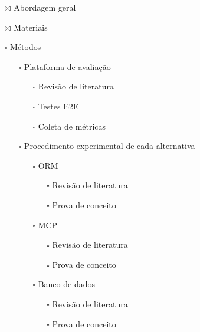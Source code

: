 \documentclass[
]{article}
\providecommand{\tightlist}{%
  \setlength{\itemsep}{0pt}\setlength{\parskip}{0pt}}
\begin{document}
\begin{itemize}
\tightlist
\item[$\boxtimes$]
  Abordagem geral
\item[$\boxtimes$]
  Materiais
\item[$\square$]
  Métodos

  \begin{itemize}
  \tightlist
  \item[$\square$]
    Plataforma de avaliação

    \begin{itemize}
    \tightlist
    \item[$\square$]
      Revisão de literatura
    \item[$\square$]
      Testes E2E
    \item[$\square$]
      Coleta de métricas
    \end{itemize}
  \item[$\square$]
    Procedimento experimental de cada alternativa

    \begin{itemize}
    \tightlist
    \item[$\square$]
      ORM

      \begin{itemize}
      \tightlist
      \item[$\square$]
        Revisão de literatura
      \item[$\square$]
        Prova de conceito
      \end{itemize}
    \item[$\square$]
      MCP

      \begin{itemize}
      \tightlist
      \item[$\square$]
        Revisão de literatura
      \item[$\square$]
        Prova de conceito
      \end{itemize}
    \item[$\square$]
      Banco de dados

      \begin{itemize}
      \tightlist
      \item[$\square$]
        Revisão de literatura
      \item[$\square$]
        Prova de conceito
      \end{itemize}
    \end{itemize}
  \end{itemize}
\end{itemize}
\end{document}
